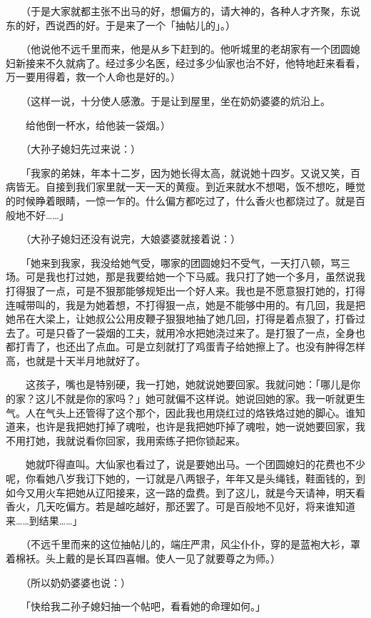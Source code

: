 \documentclass[UTF8]{ctexart}
\begin{document}
　　（于是大家就都主张不出马的好，想偏方的，请大神的，各种人才齐聚，东说东的好，西说西的好。于是来了一个「抽帖儿的」。）

　　（他说他不远千里而来，他是从乡下赶到的。他听城里的老胡家有一个团圆媳妇新接来不久就病了。经过多少名医，经过多少仙家也治不好，他特地赶来看看，万一要用得着，救一个人命也是好的。）

　　（这样一说，十分使人感激。于是让到屋里，坐在奶奶婆婆的炕沿上。

　　给他倒一杯水，给他装一袋烟。）

　　（大孙子媳妇先过来说：）

　　「我家的弟妹，年本十二岁，因为她长得太高，就说她十四岁。又说又笑，百病皆无。自接到我们家里就一天一天的黄瘦。到近来就水不想喝，饭不想吃，睡觉的时候睁着眼睛，一惊一乍的。什么偏方都吃过了，什么香火也都烧过了。就是百般地不好……」

　　（大孙子媳妇还没有说完，大娘婆婆就接着说：）

　　「她来到我家，我没给她气受，哪家的团圆媳妇不受气，一天打八顿，骂三场。可是我也打过她，那是我要给她一个下马威。我只打了她一个多月，虽然说我打得狠了一点，可是不狠那能够规矩出一个好人来。我也是不愿意狠打她的，打得连喊带叫的，我是为她着想，不打得狠一点，她是不能够中用的。有几回，我是把她吊在大梁上，让她叔公公用皮鞭子狠狠地抽了她几回，打得是着点狠了，打昏过去了。可是只昏了一袋烟的工夫，就用冷水把她浇过来了。是打狠了一点，全身也都打青了，也还出了点血。可是立刻就打了鸡蛋青子给她擦上了。也没有肿得怎样高，也就是十天半月地就好了。

　　这孩子，嘴也是特别硬，我一打她，她就说她要回家。我就问她：「哪儿是你的家？这儿不就是你的家吗？」她可就偏不这样说。她说回她的家。我一听就更生气。人在气头上还管得了这个那个，因此我也用烧红过的烙铁烙过她的脚心。谁知道来，也许是我把她打掉了魂啦，也许是我把她吓掉了魂啦，她一说她要回家，我不用打她，我就说看你回家，我用索练子把你锁起来。

　　她就吓得直叫。大仙家也看过了，说是要她出马。一个团圆媳妇的花费也不少呢，你看她八岁我订下她的，一订就是八两银子，年年又是头绳钱，鞋面钱的，到如今又用火车把她从辽阳接来，这一路的盘费。到了这儿，就是今天请神，明天看香火，几天吃偏方。若是越吃越好，那还罢了。可是百般地不见好，将来谁知道来……到结果……」

　　（不远千里而来的这位抽帖儿的，端庄严肃，风尘仆仆，穿的是蓝袍大衫，罩着棉袄。头上戴的是长耳四喜帽。使人一见了就要尊之为师。）

　　（所以奶奶婆婆也说：）

　　「快给我二孙子媳妇抽一个帖吧，看看她的命理如何。」
\end{document}
